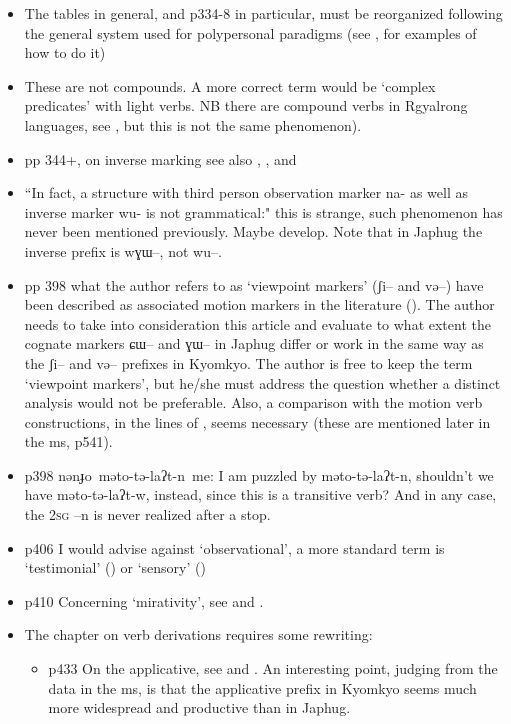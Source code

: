 \documentclass[oldfontcommands,oneside,a4paper,11pt]{article}
\newcommand{\ipa}[1]{{\phon \mbox{#1}}} %
\begin{document}
\begin{itemize}
\item The tables in general, and p334-8 in particular, must be reorganized following the general system used for polypersonal paradigms (see \citet{gongxun14agreement}, \citet{jacques14inverse} for examples of how to do it)
\item These are not compounds. A more correct term would be `complex predicates' with light verbs. NB there are compound verbs in Rgyalrong languages, see \citet{jacques12incorp}, but this is not the same phenomenon).
\item pp 344+, on inverse marking see also \citet{gongxun14agreement}, \citet{jacques14inverse}, \citet{jacques14rtau} and \citet{lai14person}
\item ``In fact, a structure with third person observation marker na- as well as inverse marker wu- is not
grammatical:" this is strange, such phenomenon has never been mentioned previously. Maybe develop. Note that in Japhug the inverse prefix is \ipa{wɣɯ--}, not \ipa{wu--}.
\item pp 398 what the author refers to as `viewpoint markers' (\ipa{ʃi--} and \ipa{və--}) have been described as associated motion markers in the literature (\citealt{jacques13harmonization}). The author needs to take into consideration this article and evaluate to what extent the cognate markers \ipa{ɕɯ--} and \ipa{ɣɯ--} in Japhug differ or work in the same way as the \ipa{ʃi--} and \ipa{və--} prefixes in Kyomkyo. The author is free to keep the term `viewpoint markers', but he/she must address  the question whether a distinct analysis would not be preferable. Also, a comparison with the motion verb constructions, in the lines of \citet[203]{jacques13harmonization}, seems necessary (these are mentioned later in the ms, p541).
\item p398 \ipa{nənɟo məto-tə-laʔt-n me}: I am puzzled by \ipa{məto-tə-laʔt-n}, shouldn't we have \ipa{məto-tə-laʔt-w}, instead, since this is a transitive verb? And in any case, the \textsc{2sg} \ipa{--n} is never realized after a stop.
\item p406 I would advise against `observational', a more standard term is `testimonial' (\citealt{hill13hdug}) or `sensory' (\citealt{tournadre14evidentiality})
\item p410 Concerning `mirativity', see \citet{hill13hdug} and \citealt{tournadre14evidentiality}.
\item The chapter on verb derivations requires some rewriting:
\begin{itemize}
\item p433 On the applicative, see \citet{jacques13tropative} and \citet{jackson14morpho}. An interesting point, judging from the data in the ms, is that the applicative prefix in Kyomkyo seems much more widespread and productive than in Japhug. 

\end{itemize}
\end{itemize}
\end{document}
